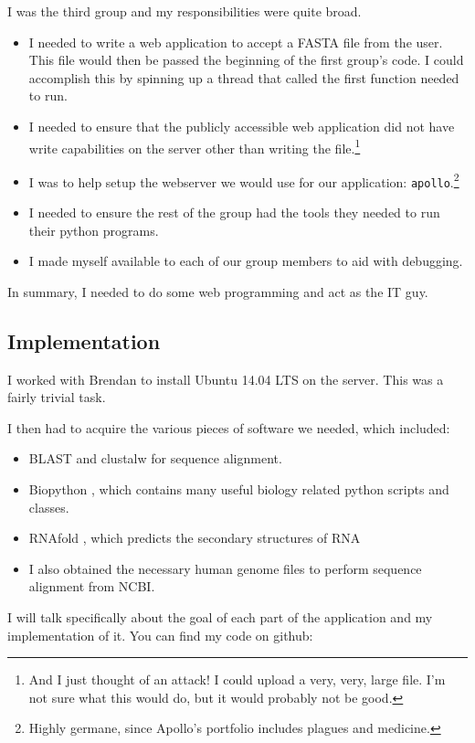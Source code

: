 \documentclass[10pt,letterpaper]{article}
\begin{document}
I was the third group and my responsibilities were quite broad.
\begin{itemize}
	\item I needed to write a web application to accept a FASTA file from the user.
	This file would then be passed the beginning of the first group's code. 
	I could accomplish this by spinning up a thread that called the first function needed to run.
	\item I needed to ensure that the publicly accessible web application did not have write capabilities on the server other than writing the file.\footnote{And I just thought of an attack!  I could upload a very, very, large file.  I'm not sure what this would do, but it would probably not be good.} 
	\item I was to help setup the webserver we would use for our application: \texttt{apollo}.\footnote{Highly germane, since Apollo's portfolio includes plagues and medicine.}
	\item I needed to ensure the rest of the group had the tools they needed to run their python programs.
	\item I made myself available to each of our group members to aid with debugging.
\end{itemize}
In summary, I needed to do some web programming and act as the IT guy.



\subsection{Implementation}
I worked with Brendan to install Ubuntu 14.04 LTS on the server. 
This was a fairly trivial task.

I then had to acquire the various pieces of software we needed, which included:

\begin{itemize}
	\item BLAST \cite{blast} and clustalw \cite{thompson2002multiple} for sequence alignment.
	\item Biopython \cite{cock2009biopython}, which contains many useful biology related python scripts and classes.
	\item RNAfold \cite{lorenz2011viennarna},  which predicts the secondary structures of RNA
	\item I also obtained the necessary human genome files to perform sequence alignment from NCBI.
\end{itemize}

I will talk specifically about the goal of each part of the application and my implementation of it.
You can find my code on github: 
\end{document}
